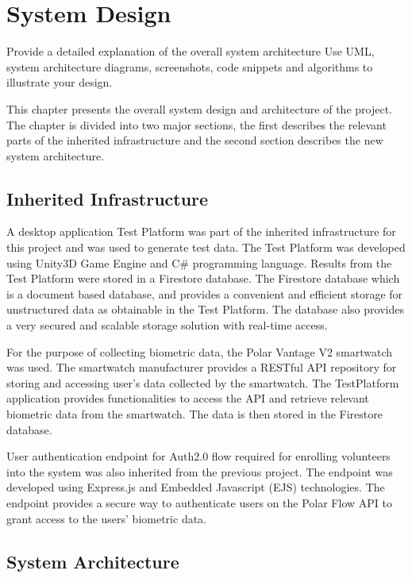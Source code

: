 \chapter{System Design}
Provide a detailed explanation of the overall system architecture %
Use UML, system architecture diagrams, screenshots, code snippets and algorithms to illustrate your design.

This chapter presents the overall system design and architecture of the project. The chapter is divided into two major sections, 
the first describes the relevant parts of the inherited infrastructure and the second section describes the new system architecture. 

\section{Inherited Infrastructure}

A desktop application Test Platform was part of the inherited infrastructure for this project and was used to generate test data.
The Test Platform was developed using Unity3D Game Engine and C\# programming language. Results from the Test Platform were stored in 
a Firestore database. The Firestore database which is a document based database, and provides a convenient and efficient storage for 
unstructured data as obtainable in the Test Platform. The database also provides a very secured and scalable storage solution with 
real-time access.

For the purpose of collecting biometric data, the Polar Vantage V2 smartwatch was used. The smartwatch manufacturer provides a RESTful API
repository for storing and accessing user's data collected by the smartwatch. The TestPlatform application provides functionalities to 
access the API and retrieve relevant biometric data from the smartwatch. The data is then stored in the Firestore database.

User authentication endpoint for Auth2.0 flow required for enrolling volunteers into the system was also inherited from the previous project. 
The endpoint was developed using Express.js and Embedded Javascript (EJS) technologies. The endpoint provides a secure way to authenticate
users on the Polar Flow API to grant access to the users' biometric data. 


\section{System Architecture}

